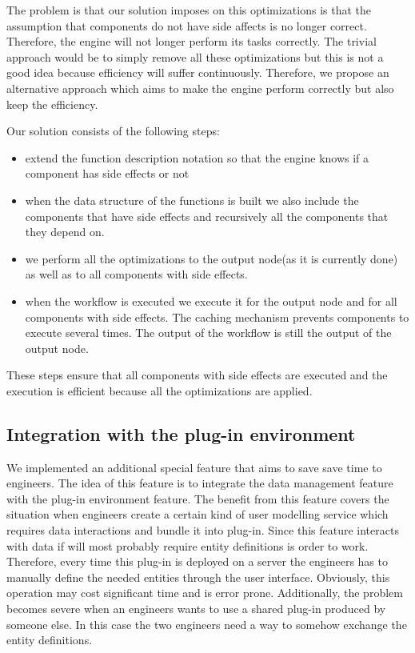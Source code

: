 \documentclass[a4paper, notitlepage]{article}
\begin{document}
The problem is that our solution imposes on this optimizations is that the assumption that components do not have side affects is no longer correct. Therefore, the engine will not longer perform its tasks correctly. The trivial approach would be to simply remove all these optimizations but this is not a good idea because efficiency will suffer continuously. Therefore, we propose an alternative approach which aims to make the engine perform correctly but also keep the efficiency.

Our solution consists of the following steps:
\begin{itemize}
	\item extend the function description notation so that the engine knows if a component has side effects or not
	\item when the data structure of the functions is built we also include the components that have side effects and recursively all the components that they depend on.
	\item we perform all the optimizations to the output node(as it is currently done) as well as to all components with side effects. 
	\item when the workflow is executed we execute it for the output node and for all components with side effects. The caching mechanism prevents components to execute several times. The output of the workflow is still the output of the output node.
\end{itemize}

These steps ensure that all components with side effects are executed and the execution is efficient because all the optimizations are applied.

\subsection{Integration with the plug-in environment}

We implemented an additional special feature that aims to save save time to engineers. The idea of this feature is to integrate the data management feature with the plug-in environment feature. The benefit from this feature covers the situation when engineers create a certain kind of user modelling service which requires data interactions and  bundle it into plug-in. Since this feature interacts with data if will most probably require entity definitions is order to work. Therefore, every time this plug-in is deployed on a server the engineers has to manually define the needed entities through the user interface. Obviously, this operation may cost significant time and is error prone. Additionally, the problem becomes severe when an engineers wants to use a shared plug-in produced by someone else. In this case the two engineers need a way to somehow exchange the entity definitions.
\end{document}
